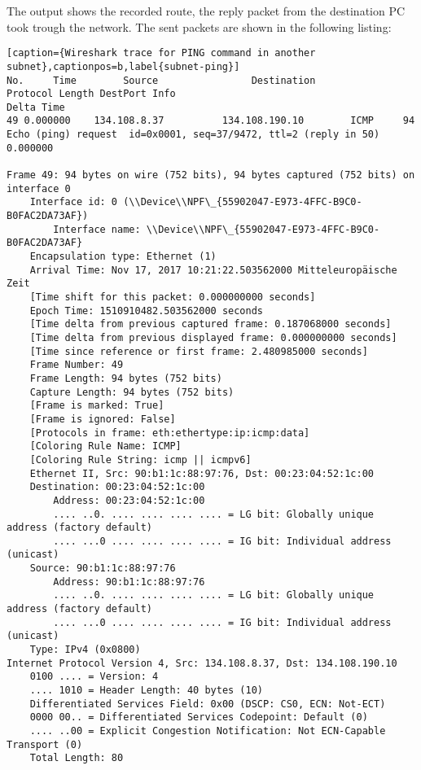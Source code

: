 The output shows the recorded route, the reply packet from the destination PC took trough the network. The sent packets are shown in the following listing:
\\
\begin{lstlisting}[caption={Wireshark trace for PING command in another subnet},captionpos=b,label{subnet-ping}]
No.     Time        Source                Destination           Protocol Length DestPort Info                                                            Delta Time
49 0.000000    134.108.8.37          134.108.190.10        ICMP     94              Echo (ping) request  id=0x0001, seq=37/9472, ttl=2 (reply in 50) 0.000000

Frame 49: 94 bytes on wire (752 bits), 94 bytes captured (752 bits) on interface 0
	Interface id: 0 (\\Device\\NPF\_{55902047-E973-4FFC-B9C0-B0FAC2DA73AF})
		Interface name: \\Device\\NPF\_{55902047-E973-4FFC-B9C0-B0FAC2DA73AF}
	Encapsulation type: Ethernet (1)
	Arrival Time: Nov 17, 2017 10:21:22.503562000 Mitteleuropäische Zeit
	[Time shift for this packet: 0.000000000 seconds]
	Epoch Time: 1510910482.503562000 seconds
	[Time delta from previous captured frame: 0.187068000 seconds]
	[Time delta from previous displayed frame: 0.000000000 seconds]
	[Time since reference or first frame: 2.480985000 seconds]
	Frame Number: 49
	Frame Length: 94 bytes (752 bits)
	Capture Length: 94 bytes (752 bits)
	[Frame is marked: True]
	[Frame is ignored: False]
	[Protocols in frame: eth:ethertype:ip:icmp:data]
	[Coloring Rule Name: ICMP]
	[Coloring Rule String: icmp || icmpv6]
	Ethernet II, Src: 90:b1:1c:88:97:76, Dst: 00:23:04:52:1c:00
	Destination: 00:23:04:52:1c:00
		Address: 00:23:04:52:1c:00
		.... ..0. .... .... .... .... = LG bit: Globally unique address (factory default)
		.... ...0 .... .... .... .... = IG bit: Individual address (unicast)
	Source: 90:b1:1c:88:97:76
		Address: 90:b1:1c:88:97:76
		.... ..0. .... .... .... .... = LG bit: Globally unique address (factory default)
		.... ...0 .... .... .... .... = IG bit: Individual address (unicast)
	Type: IPv4 (0x0800)
Internet Protocol Version 4, Src: 134.108.8.37, Dst: 134.108.190.10
	0100 .... = Version: 4
	.... 1010 = Header Length: 40 bytes (10)
	Differentiated Services Field: 0x00 (DSCP: CS0, ECN: Not-ECT)
	0000 00.. = Differentiated Services Codepoint: Default (0)
	.... ..00 = Explicit Congestion Notification: Not ECN-Capable Transport (0)
	Total Length: 80

\end{lstlisting}
